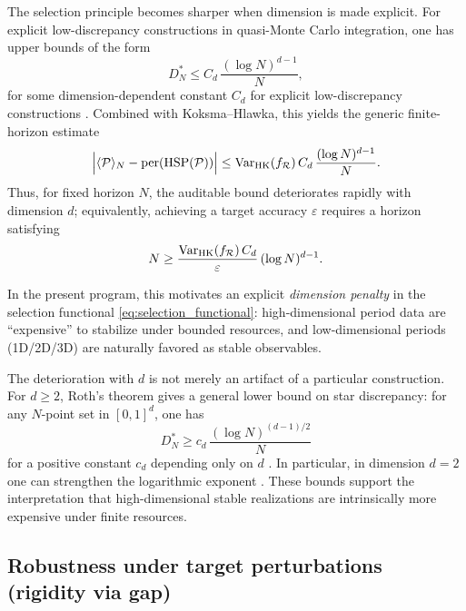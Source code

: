 The selection principle becomes sharper when dimension is made explicit. For explicit low-discrepancy constructions in quasi-Monte Carlo integration, one has upper bounds of the form
\begin{equation}
\label{eq:star_discrepancy_upper}
D_N^\ast \le C_d\,\frac{(\log N)^{d-1}}{N},
\end{equation}
for some dimension-dependent constant $C_d$ for explicit low-discrepancy constructions \cite{Niederreiter1992,DickPillichshammer2010}. Combined with Koksma--Hlawka, this yields the generic finite-horizon estimate
\begin{equation}
\label{eq:qmc_dimension_penalty}
\Big|\langle \mathcal{P} \rangle_N-\mathrm{per}(\mathrm{HSP}(\mathcal{P}))\Big|
\le
\mathrm{Var}_{\mathrm{HK}}(f_{\mathcal{R}})\,C_d\,\frac{(\log N)^{d-1}}{N}.
\end{equation}
Thus, for fixed horizon $N$, the auditable bound deteriorates rapidly with dimension $d$; equivalently, achieving a target accuracy $\varepsilon$ requires a horizon satisfying
\begin{equation}
\label{eq:inverse_discrepancy_requirement}
N \ge \frac{\mathrm{Var}_{\mathrm{HK}}(f_{\mathcal{R}})\,C_d}{\varepsilon}\,(\log N)^{d-1}.
\end{equation}

In the present program, this motivates an explicit \emph{dimension penalty} in the selection functional \eqref{eq:selection_functional}: high-dimensional period data are ``expensive'' to stabilize under bounded resources, and low-dimensional periods (1D/2D/3D) are naturally favored as stable observables.

\begin{remark}
The deterioration with $d$ is not merely an artifact of a particular construction. For $d\ge 2$, Roth's theorem gives a general lower bound on star discrepancy: for any $N$-point set in $[0,1]^d$, one has
\[
D_N^\ast \ge c_d\,\frac{(\log N)^{(d-1)/2}}{N}
\]
for a positive constant $c_d$ depending only on $d$ \cite{Roth1954,Matousek1999}. In particular, in dimension $d=2$ one can strengthen the logarithmic exponent \cite{Schmidt1972}. These bounds support the interpretation that high-dimensional stable realizations are intrinsically more expensive under finite resources.
\end{remark}

\subsection{Robustness under target perturbations (rigidity via gap)}
\label{sec:robustness_gap}

